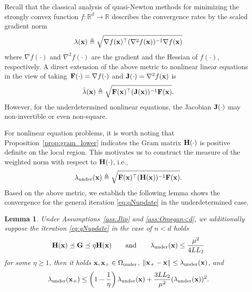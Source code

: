 \documentclass[11pt]{article}
\theoremstyle{plain}
\newtheorem{lemma}[theorem]{Lemma}
\theoremstyle{definition}
\theoremstyle{remark}
\theoremstyle{plain}
\def\vx{{\bf{x}}}
\def\BR{{\mathbb{R}}}
\def\mF {{\bf F}}
\def\mJ {{\bf J}}
\def\vx {{{\bf x}}}
\def\BR{{\mathbb{R}}}
\def\F{{\bf F}}
\def\G{{\bf G}}
\def\H{{\bf H}}
\def \J{{\bf J}}
\def\x{{\bf x}}
\begin{document}
Recall that the classical analysis of quasi-Newton methods for minimizing the strongly convex function $f:\BR^d\to\BR$ \citep{rodomanov2021greedy} describes the convergence rates by the scaled gradient norm 
\begin{align*}
\lambda(\vx)\triangleq\sqrt{\nabla f(\x)^{\top}(\nabla^2f(\x))^{-1}\nabla f(\x)}     
\end{align*}
where $\nabla f(\cdot)$ and $\nabla^2 f(\cdot)$ are the gradient and the Hessian of $f(\cdot)$, respectively.
A direct extension of the above metric to nonlinear linear equations in the view of taking~$\mF(\cdot)=\nabla f(\cdot)$ and $\mJ(\cdot)=\nabla^2 f(\vx)$ is
\begin{align}
\label{eq:ordi-measure}
    \hat{\lambda}(\x) \triangleq \sqrt{\F(\x)^{\top}(\J(\x))^{-1}\F(\x)}.
\end{align}
However, for the underdetermined nonlinear equations, the Jacobian $\J(\cdot)$ may non-invertible or even non-square. 

For nonlinear equation problems,
it is worth noting that Proposition~\ref{prop:gram_lower} indicates the Gram matrix $\H(\cdot)$ is positive definite on the local region.
This motivates us to construct the measure of the weighted norm with respect to $\H(\cdot)$, i.e.,
\begin{align*}
    \lambda_{\mathrm{under}}(\x) \triangleq \sqrt{\F(\x)^{\top}(\H(\x))^{-1}\F(\x)}.
\end{align*}
Based on the above metric, we establish the following lemma shows the convergence for the general iteration \eqref{eq:qNupdate} in the underdetermined case.
\begin{lemma}
\label{lm:linear-quadra_n<d}
Under Assumptions~\ref{ass:Jlip} and \ref{ass:Omegan<d}, we additionally suppose the iteration \eqref{eq:qNupdate} in the case of $n<d$ holds
  \begin{align}
  \label{eq:G_condi_2}
      \H(\x)\preceq \G\preceq\eta\H(\x)
      \qquad\text{and}\qquad
      \lambda_{\mathrm{under}}(\x)\leq \frac{\mu^2}{4LL_2}
  \end{align}
for some $\eta\geq1$, then it holds $\x,\x_{+}\in\Omega_{\mathrm{under}}$, $\|\x_{+}-\x\|\leq\lambda_{\mathrm{under}}(\x)$, and
  \begin{align}
  \label{eq:linear-quadra-n<d}
      \lambda_{\mathrm{under}}(\x_{+})\leq \left(1-\frac{1}{\eta}\right)\lambda_{\mathrm{under}}(\x) + \frac{3LL_2}{\mu^2}(\lambda_{\mathrm{under}}(\x))^2.
  \end{align}
\end{lemma}
\end{document}

